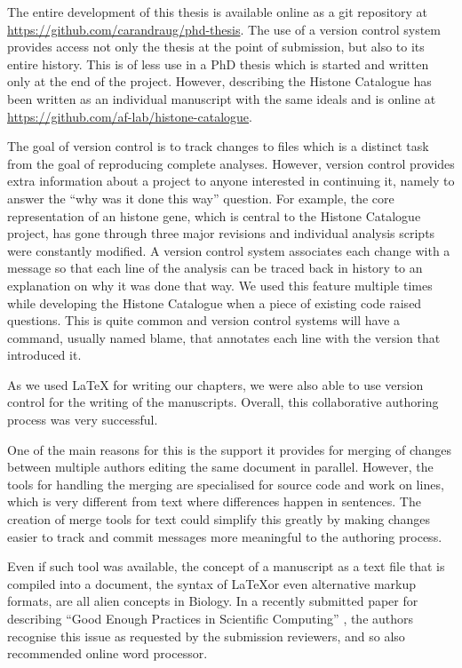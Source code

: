 The entire development of this thesis is available online as a git
repository at \url{https://github.com/carandraug/phd-thesis}.  The use
of a version control system provides access not only the thesis at the
point of submission, but also to its entire history.
This is of less use
in a PhD thesis which is started and written only at the end of the
project.
However,  describing the Histone Catalogue
has been written as an individual
manuscript with the same ideals and is online at
\url{https://github.com/af-lab/histone-catalogue}.

The goal of version control is to track changes to files which is a
distinct task from the goal of reproducing complete analyses.
However, version control provides extra information about a project to
anyone interested in continuing it, namely to answer the ``why was it
done this way'' question.  For example, the core
representation of an histone gene,
which is central to the Histone Catalogue project, has gone through
three major revisions and individual analysis scripts were constantly
modified.  A version control system associates each change with a
message so that each line of the analysis can be traced back in
history to an explanation on why it was done that way.  We used this
feature multiple times while developing the Histone Catalogue when a
piece of existing code raised questions.
This is quite common and version control systems will have a command,
usually named blame, that annotates each line with the version that
introduced it.

As we used \LaTeX{} for
writing our chapters, we were also able to use version control for
the writing of the manuscripts.
Overall, this collaborative authoring process was very successful.

One of the main reasons for this
is the support it provides for merging of changes between multiple authors
editing the same document in parallel.  However, the tools for
handling the merging are specialised for source code and work on
lines, which is very different from text where differences
happen in sentences.  The creation of merge tools for text could
simplify this greatly by making changes easier to track and commit
messages more meaningful to the authoring process.

Even if such tool was available, the concept of a manuscript as a text
file that is compiled into a document, the syntax of \LaTeX or even
alternative markup formats, are all alien concepts in Biology.
In a recently submitted paper for describing ``Good Enough
Practices in Scientific Computing'' \citep{good-enough-2016-v2}, the
authors recognise this issue as requested by the submission reviewers,
and so also recommended online word processor.

